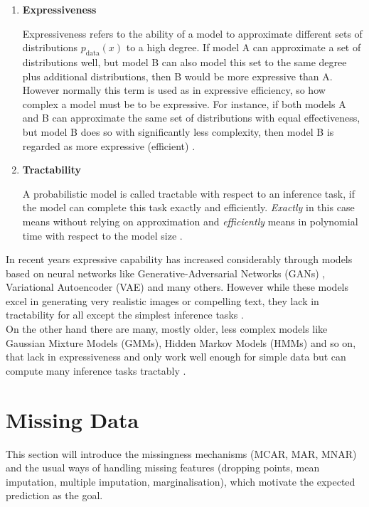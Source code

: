 \begin{enumerate}
    \item \textbf{Expressiveness} 
    
    Expressiveness refers to the ability of a model to approximate different sets of distributions $p_{\text{data}}(x)$ to a high degree. If model A can approximate a set of 
    distributions well, but model B can also model this set to the same degree plus additional distributions, then B would be more expressive than A.
    However normally this term is used as in expressive efficiency, so how complex a model must be 
    to be expressive.  For instance, if both models A and B can approximate the same set of distributions with equal effectiveness, but model B does so with significantly less complexity, then model B is regarded as more expressive (efficient) \cite{pc_intro}.
    \\
    \item \textbf{Tractability} 
    
    A probabilistic model is called tractable with respect to an inference task, if the model can complete this 
    task exactly and efficiently. \emph{Exactly} in this case means without relying on approximation and \emph{efficiently} 
    means in polynomial time with respect to the model size \cite{pc_intro}.
\end{enumerate}


In recent years expressive capability has increased considerably through models based on neural networks like Generative-Adversarial
Networks (GANs) \cite{gan}, Variational Autoencoder (VAE) \cite{vae} and many others. However while these models excel in generating 
very realistic images or compelling text, they lack in tractability for all except the simplest inference tasks
\cite{pc_intro}. \\

On the other hand there are many, mostly older, less complex models like Gaussian Mixture Models (GMMs), Hidden Markov Models (HMMs) and so on, 
that lack in expressiveness and only work well enough for simple data but can compute many inference tasks tractably \cite{ml_book}.

\section{Missing Data}
\label{sec:missing-data}

This section will introduce the missingness mechanisms (MCAR, MAR, MNAR) and the usual ways of handling missing features (dropping points, mean imputation, multiple imputation, marginalisation), which motivate the expected prediction as the goal.

